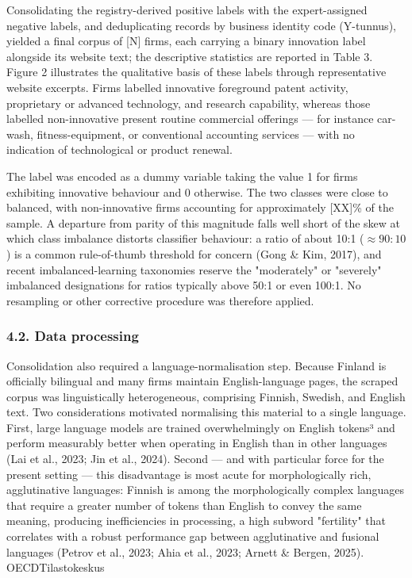 \documentclass[runningheads]{llncs}
\begin{document}
Consolidating the registry-derived positive labels with the expert-assigned negative labels, and deduplicating records by business identity code (Y-tunnus), yielded a final corpus of [N] firms, each carrying a binary innovation label alongside its website text; the descriptive statistics are reported in Table 3. Figure 2 illustrates the qualitative basis of these labels through representative website excerpts. Firms labelled innovative foreground patent activity, proprietary or advanced technology, and research capability, whereas those labelled non-innovative present routine commercial offerings — for instance car-wash, fitness-equipment, or conventional accounting services — with no indication of technological or product renewal.

The label was encoded as a dummy variable taking the value 1 for firms exhibiting innovative behaviour and 0 otherwise. The two classes were close to balanced, with non-innovative firms accounting for approximately [XX]\% of the sample. A departure from parity of this magnitude falls well short of the skew at which class imbalance distorts classifier behaviour: a ratio of about 10:1 ($\approx 90:10$) is a common rule-of-thumb threshold for concern (Gong \& Kim, 2017), and recent imbalanced-learning taxonomies reserve the "moderately" or "severely" imbalanced designations for ratios typically above 50:1 or even 100:1. No resampling or other corrective procedure was therefore applied.


\subsubsection{4.2. Data processing}


Consolidation also required a language-normalisation step. Because Finland is officially bilingual and many firms maintain English-language pages, the scraped corpus was linguistically heterogeneous, comprising Finnish, Swedish, and English text. Two considerations motivated normalising this material to a single language. First, large language models are trained overwhelmingly on English tokens³ and perform measurably better when operating in English than in other languages (Lai et al., 2023; Jin et al., 2024). Second — and with particular force for the present setting — this disadvantage is most acute for morphologically rich, agglutinative languages: Finnish is among the morphologically complex languages that require a greater number of tokens than English to convey the same meaning, producing inefficiencies in processing, a high subword "fertility" that correlates with a robust performance gap between agglutinative and fusional languages (Petrov et al., 2023; Ahia et al., 2023; Arnett \& Bergen, 2025). OECDTilastokeskus
\end{document}
